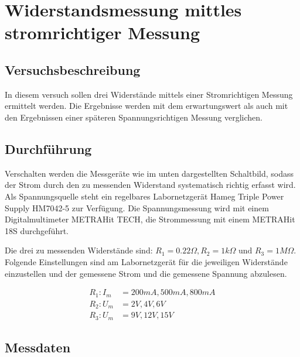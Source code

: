 \section[Stromrichtige Messung]{Widerstandsmessung mittles stromrichtiger Messung}
\subsection{Versuchsbeschreibung}

In diesem versuch sollen drei Widerstände mittels einer Stromrichtigen Messung ermittelt werden. Die Ergebnisse werden mit dem erwartungswert als auch mit den Ergebnissen einer späteren Spannungsrichtigen Messung verglichen.

\subsection{Durchführung}
Verschalten werden die Messgeräte wie im unten dargestellten Schaltbild, sodass der Strom durch den zu messenden Widerstand systematisch richtig erfasst wird. Als Spannungsquelle steht ein regelbares Labornetzgerät Hameg Triple Power Supply HM7042-5 zur Verfügung. Die Spannungsmessung wird mit einem Digitalmultimeter METRAHit TECH, die Strommessung mit einem METRAHit 18S durchgeführt.

Die drei zu messenden Widerstände sind: \(R_1 = 0.22\Omega, R_2 = 1k\Omega \text{ und } R_3 = 1M\Omega\).
Folgende Einstellungen sind am Labornetzgerät für die jeweiligen Widerstände einzustellen und der gemessene Strom und die gemessene Spannung abzulesen.

\[
\begin{aligned}
R_1: I_m &= 200mA, 500mA, 800mA\\
R_2: U_m &= 2V, 4V, 6V\\
R_3: U_m &= 9V, 12V, 15V
\end{aligned}
\]

\newpage
\subsection{Messdaten}

